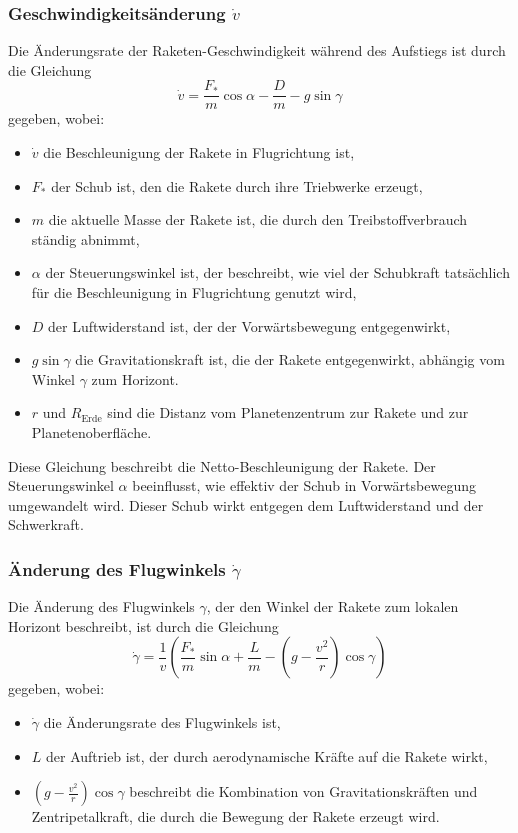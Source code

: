 \subsubsection{Geschwindigkeitsänderung \(\dot{v}\)}
Die Änderungsrate der Raketen-Geschwindigkeit während des Aufstiegs ist durch die Gleichung
\[
\dot{v} = \frac{F_*}{m} \cos \alpha - \frac{D}{m} - g \sin \gamma
\]
gegeben, wobei:
\begin{itemize}
	\item \(\dot{v}\) die Beschleunigung der Rakete in Flugrichtung ist,
	\item \(F_*\) der Schub ist, den die Rakete durch ihre Triebwerke erzeugt,
	\item \(m\) die aktuelle Masse der Rakete ist, die durch den Treibstoffverbrauch ständig abnimmt,
	\item \(\alpha\) der Steuerungswinkel ist, der beschreibt, wie viel der Schubkraft tatsächlich für die Beschleunigung in Flugrichtung genutzt wird,
	\item \(D\) der Luftwiderstand ist, der der Vorwärtsbewegung entgegenwirkt,
	\item \(g \sin \gamma\) die Gravitationskraft ist, die der Rakete entgegenwirkt, abhängig vom Winkel \(\gamma\) zum Horizont.
    \item \(r\) und \(R_{\text{Erde}}\) sind die Distanz vom Planetenzentrum zur Rakete und zur Planetenoberfläche.
\end{itemize}
Diese Gleichung beschreibt die Netto-Beschleunigung der Rakete. Der Steuerungswinkel \(\alpha\) beeinflusst, wie effektiv der Schub in Vorwärtsbewegung umgewandelt wird. Dieser Schub wirkt entgegen dem Luftwiderstand und der Schwerkraft. 


\subsubsection{Änderung des Flugwinkels \(\dot{\gamma}\)}
Die Änderung des Flugwinkels \(\gamma\), der den Winkel der Rakete zum lokalen Horizont beschreibt, ist durch die Gleichung
\[
\dot{\gamma} = \frac{1}{v}\left( \frac{F_*}{m} \sin \alpha + \frac{L}{m} - \left(g - \frac{v^2}{r}\right) \cos \gamma \right)
\]
gegeben, wobei:
\begin{itemize}
	\item \(\dot{\gamma}\) die Änderungsrate des Flugwinkels ist,
	\item \(L\) der Auftrieb ist, der durch aerodynamische Kräfte auf die Rakete wirkt,
	\item \(\left(g - \frac{v^2}{r}\right) \cos \gamma\) beschreibt die Kombination von Gravitationskräften und Zentripetalkraft, die durch die Bewegung der Rakete erzeugt wird.
\end{itemize}

